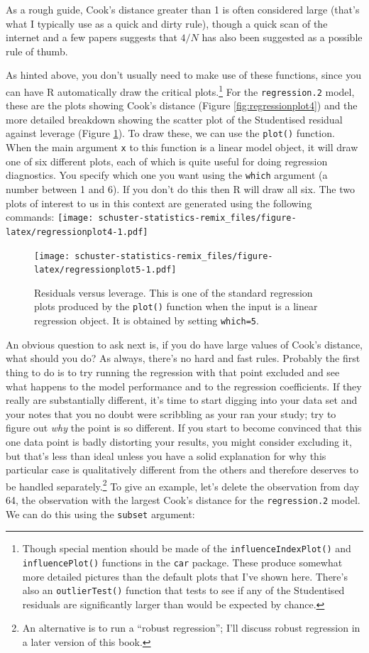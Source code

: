 \documentclass[
]{book}
\begin{document}
As a rough guide, Cook's distance greater than 1 is often considered large (that's what I typically use as a quick and dirty rule), though a quick scan of the internet and a few papers suggests that \(4/N\) has also been suggested as a possible rule of thumb.

As hinted above, you don't usually need to make use of these functions, since you can have R automatically draw the critical plots.\footnote{Though special mention should be made of the \texttt{influenceIndexPlot()} and \texttt{influencePlot()} functions in the \texttt{car} package. These produce somewhat more detailed pictures than the default plots that I've shown here. There's also an \texttt{outlierTest()} function that tests to see if any of the Studentised residuals are significantly larger than would be expected by chance.} For the \texttt{regression.2} model, these are the plots showing Cook's distance (Figure \ref{fig:regressionplot4}) and the more detailed breakdown showing the scatter plot of the Studentised residual against leverage (Figure \ref{fig:regressionplot5}). To draw these, we can use the \texttt{plot()} function. When the main argument \texttt{x} to this function is a linear model object, it will draw one of six different plots, each of which is quite useful for doing regression diagnostics. You specify which one you want using the \texttt{which} argument (a number between 1 and 6). If you don't do this then R will draw all six. The two plots of interest to us in this context are generated using the following commands:
\texttt{[image: schuster-statistics-remix\_files/figure-latex/regressionplot4-1.pdf]}

\begin{figure}
\centering
\texttt{[image: schuster-statistics-remix\_files/figure-latex/regressionplot5-1.pdf]}
\caption{\label{fig:regressionplot5}Residuals versus leverage. This is one of the standard regression plots produced by the \texttt{plot()} function when the input is a linear regression object. It is obtained by setting \texttt{which=5}.}
\end{figure}

An obvious question to ask next is, if you do have large values of Cook's distance, what should you do? As always, there's no hard and fast rules. Probably the first thing to do is to try running the regression with that point excluded and see what happens to the model performance and to the regression coefficients. If they really are substantially different, it's time to start digging into your data set and your notes that you no doubt were scribbling as your ran your study; try to figure out \emph{why} the point is so different. If you start to become convinced that this one data point is badly distorting your results, you might consider excluding it, but that's less than ideal unless you have a solid explanation for why this particular case is qualitatively different from the others and therefore deserves to be handled separately.\footnote{An alternative is to run a ``robust regression''; I'll discuss robust regression in a later version of this book.} To give an example, let's delete the observation from day 64, the observation with the largest Cook's distance for the \texttt{regression.2} model. We can do this using the \texttt{subset} argument:
\end{document}
